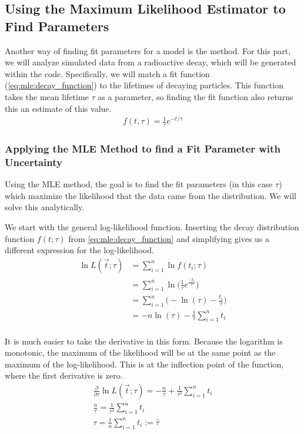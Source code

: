 \subsection{Using the Maximum Likelihood Estimator to Find Parameters}
\label{sec:analysis:mle}

Another way of finding fit parameters for a model is the  method. For this part, we will analyze simulated data from a radioactive decay, which will be generated within the code. Specifically, we will match a fit function (\autoref{eq:mle:decay_function}) to the lifetimes of decaying particles. This function takes the mean lifetime \( \tau \) as a parameter, so finding the fit function also returns this an estimate of this value.
\begin{gather}
    f(t, \tau) = \frac{1}{\tau} e^{-t/\tau}
    \label{eq:mle:decay_function}
\end{gather}

\subsubsection{Applying the MLE Method to find a Fit Parameter with Uncertainty}


Using the MLE method, the goal is to find the fit parameters (in this case \( \tau \)) which maximize the likelihood that the data came from the distribution. We will solve this analytically.

We start with the general log-likelihood function. Inserting the decay distribution function $f(t ; \tau)$ from \autoref{eq:mle:decay_function} and simplifying gives us a different expression for the log-likelihood.
\begin{align}
    \ln L(\vec{t} ; \tau) &= \sum \limits_{i = 1}^{n} \ln f(t_i ; \tau) \\
    &= \sum \limits_{i = 1}^{n} \ln \Big( \frac{1}{\tau} e^{\frac{-t_i}{\tau}} \Big) \\
    &= \sum \limits_{i = 1}^{n} \Big( - \ln (\tau) - \frac{t_i}{\tau} \Big) \\
    &= - n \ln (\tau) - \frac{1}{\tau} \sum \limits_{i = 1}^{n} t_i \\
\end{align}

It is much easier to take the derivative in this form. Because the logarithm is monotonic, the maximum of the likelihood will be at the same point as the maximum of the log-likelihood. This is at the inflection point of the function, where the first derivative is zero.
\begin{gather}
    \frac{\partial}{\partial \tau} \ln L(\vec{t} ; \tau) = -\frac{n}{\tau} + \frac{1}{\tau^2} \sum \limits_{i = 1}^{n} t_i \\
    \frac{n}{\tau} = \frac{1}{\tau^2} \sum \limits_{i = 1}^{n} t_i \\
    \tau = \frac{1}{n} \sum \limits_{i = 1}^{n} t_i := \hat{\tau}
    \label{eq:mle:tau_hat_mle}
\end{gather}

